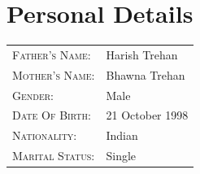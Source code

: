 \documentclass{my_cv}
\begin{document}
    \section{Personal Details}
 
 	\begin{tabular}{ll}
    	\textsc{Father's Name:} & Harish Trehan \\
    	\textsc{Mother's Name:}       & Bhawna Trehan \\
    	\textsc{Gender:}         & Male \\
    	\textsc{Date Of Birth:}         & 21 October 1998 \\
    	\textsc{Nationality:}   & Indian \\
    	\textsc{Marital Status:} & Single \\
    \end{tabular}
	
\end{document}
